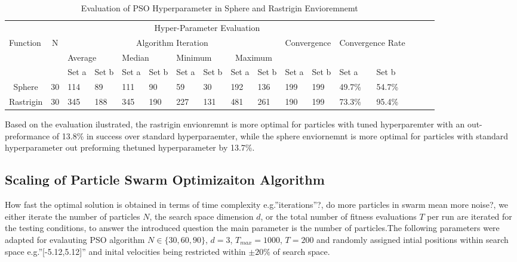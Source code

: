 \documentclass[
]{article}
\begin{document}
\begin{table}[h]
\centering
\begin{tabular}{p{0.65cm}p{0.65cm}p{0.65cm}p{0.65cm}p{0.65cm}p{0.65cm}p{0.65cm}p{0.65cm}p{0.65cm}p{0.65cm}p{0.65cm}p{0.65cm}p{0.65cm}p{0.65cm}p{0.65cm}p{0.65cm}p{0.65cm}}
\cline{1-14}
\multicolumn{14}{c}{Hyper-Parameter Evaluation}                                                                                   &  &  \\ \cline{1-14}
Function &
  \multicolumn{1}{c}{N} &
  \multicolumn{8}{c}{Algorithm Iteration} &
  \multicolumn{2}{c}{Convergence} &
  \multicolumn{2}{c}{Convergence Rate} &
  \multicolumn{2}{c}{} \\ \cline{3-10}
 &
  \multicolumn{1}{c}{} &
  \multicolumn{2}{l}{Average} &
  \multicolumn{2}{l}{Median} &
  \multicolumn{2}{l}{Minimum} &
  \multicolumn{2}{c}{Maximum} &
   &
   &
   &
   &
   &
   \\ \cline{3-14}
&    & Set a & Set b & Set a & Set b & Set a & Set b & Set a & Set b & Set a & Set b & Set a  & Set b  &  &  \\ \cline{1-14}
\multicolumn{1}{c}{Sphere} & 30 & 114   & 89    & 111   & 90    & 59    & 30    & 192   & 136   & 199   & 199   & 49.7\% & 54.7\% &  &  \\
Rastrigin                  & 30 & 345   & 188   & 345   & 190   & 227   & 131   & 481   & 261   & 190   & 199   & 73.3\% & 95.4\% &  &  \\
                        
\end{tabular}
\caption{\label{Eval}Evaluation of PSO Hyperparameter in Sphere and Rastrigin Envioremnemt}
\end{table}

Based on the evaluation ilustrated, the rastrigin envionremnt is more
optimal for particles with tuned hyperparemter with an out-preformance
of 13.8\% in success over standard hyperparaemter, while the sphere
enviornemnt is more optimal for particles with standard hyperparameter
out preforming thetuned hyperparameter by 13.7\%.

\newpage

\hypertarget{scaling-of-particle-swarm-optimizaiton-algorithm}{%
\subsection{Scaling of Particle Swarm Optimizaiton
Algorithm}\label{scaling-of-particle-swarm-optimizaiton-algorithm}}

How fast the optimal solution is obtained in terms of time complexity
e.g.''iterations''?, do more particles in swarm mean more noise?, we
either iterate the number of particles \(N\), the search space dimension
\(d\), or the total number of fitness evaluations \(T\) per run are
iterated for the testing conditions, to answer the introduced question
the main parameter is the number of particles.The following parameters
were adapted for evalauting PSO algorithm \(N\in\{30,60,90\}\), \(d=3\),
\(T_{max}=1000\), \(T=200\) and randomly assigned intial positions
within search space e.g.''{[}-5.12,5.12{]}'' and inital velocities being
restricted within \(\pm20\%\) of search space.
\end{document}
